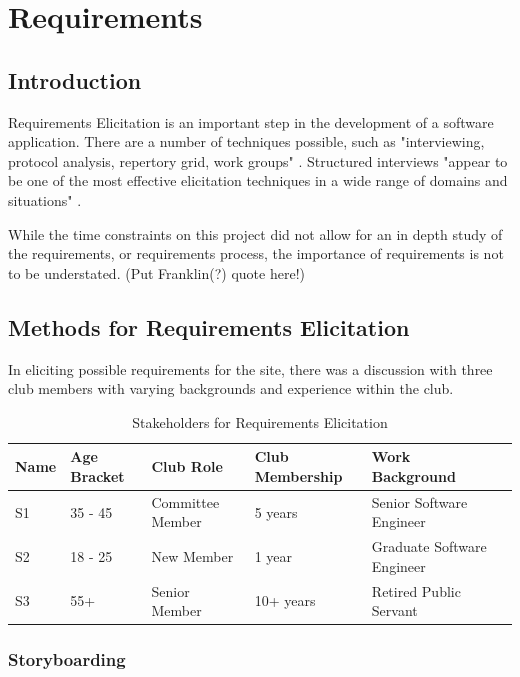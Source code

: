 \chapter{Requirements}
\label{requirements}

\section{Introduction}

Requirements Elicitation is an important step in the development of a software application. There are a number of techniques possible, such as "interviewing, protocol analysis, repertory grid, work groups" \parencite{davis2006effectiveness}. Structured interviews "appear to be one of the most effective elicitation techniques in a wide range of domains and situations" \parencite{davis2006effectiveness}. 

While the time constraints on this project did not allow for an in depth study of the requirements, or requirements process, the importance of requirements is not to be understated. (Put Franklin(?) quote here!)

\section{Methods for Requirements Elicitation}

In eliciting possible requirements for the site, there was a discussion with three club members with varying backgrounds and experience within the club.

\begin{table}[H]
\caption{Stakeholders for Requirements Elicitation}
\begin{center}
    \begin{tabular}{ | l | l | l | l | l| p{5cm} |}
    \hline
    Name & Age Bracket & Club Role & Club Membership & Work Background \\ \hline
	S1 & 35 - 45& Committee Member & 5 years & Senior Software Engineer \\ \hline
	S2 & 18 - 25 & New Member & 1 year & Graduate Software Engineer \\ \hline
	S3 & 55+ & Senior Member & 10+ years & Retired Public Servant \\ \hline
    \end{tabular}
\end{center}
\label{fig:userelicit}
\end{table}


\subsection{Storyboarding}

